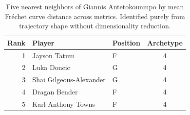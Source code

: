 \begin{table}[htbp]
  \centering\small
  \begin{tabular}{rllc}
    \toprule
    Rank & Player & Position & Archetype \\
    \midrule
    1 & Jayson Tatum & F & 4 \\
    2 & Luka Doncic & G & 4 \\
    3 & Shai Gilgeous-Alexander & G & 4 \\
    4 & Dragan Bender & F & 4 \\
    5 & Karl-Anthony Towns & F & 4 \\
    \bottomrule
  \end{tabular}
  \caption{Five nearest neighbors of Giannis Antetokounmpo by mean Fr\'{e}chet curve distance across metrics. Identified purely from trajectory shape without dimensionality reduction.}
  \label{tab:Giannis_Antetokounmpo_frechet_curve_neighbors}
\end{table}

